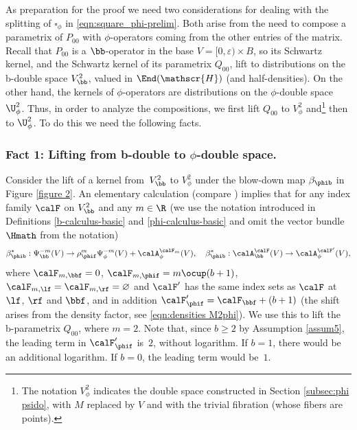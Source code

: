 As preparation for the proof we need two considerations for dealing with the splitting of $\square_\phi$ in
\eqref{eqn:square_phi-prelim}. Both arise from the need to compose a parametrix of $P_{00}$ with $\phi$\nobreakdash-operators coming from the other entries of the matrix. Recall that $P_{00}$ is a $\bb$\nobreakdash-operator in the base $V=[0,\varepsilon) \times B$, so its
Schwartz kernel, and the Schwartz kernel of its parametrix $Q_{00}$, lift to distributions on the b-double space
$V^2_\bb$, valued in $\End(\mathscr{H})$ (and half-densities). On the other hand, the kernels of $\phi$-operators are distributions on the $\phi$-double space $\U^2_\phi$. Thus, in order to analyze the compositions, we first lift $Q_{00}$ to $V^2_\phi$ and\footnote{The notation $V^2_\phi$ indicates the double space constructed in Section \ref{subsec:phi psido}, with $M$ replaced by $V$ and with the trivial fibration (whose fibers are points).} then to $\U^2_\phi$. To do this we need the following facts.

\subsubsection*{Fact 1: Lifting from b-double to $\phi$-double space.}

Consider the lift of a kernel from~$V^2_\bb$ to $V^2_\phi$ under the blow-down
map $\beta_{\phib}$ in Figure \ref{figure 2}. An elementary calculation
(compare \cite[Prop.\,1]{grieser-para}) implies that for any index
family $\calF$ on $V^2_\bb$ and any $m\in\R$ (we use the notation introduced in
Definitions \ref{b-calculus-basic} and \ref{phi-calculus-basic} and omit the vector bundle $\Hmath$ from the notation)
\begin{equation}
\label{eqn:lifting}
\beta_{\phib}^*: \Psi_\bb^{-m}(V) \to \rho_\phif^m\Psi_\phi^{-m}(V) +\calA^{\calF_m}_\phi(V),
\quad \beta_{\phib}^*: \calA^{\calF}_\bb(V) \to \calA^{\calF'}_\phi(V),
\end{equation}
where $\calF_{m,\bbf}=0$, $\calF_{m,\phif}=m \ocup (b+1)$, $\calF_{m,\lf}=\calF_{m,\rf}=\varnothing$
and $\calF'$ has the same index sets as $\calF$ at $\lf$, $\rf$ and $\bbf$, and in addition
$\calF'_\phif = \calF_\bbf+(b+1)$ (the shift arises from the density factor, see \eqref{eqn:densities M2phi}).
We use this to lift the b-parametrix $Q_{00}$, where $m=2$. Note that, since $b\geq2$ by Assumption \ref{assum5}, the leading term in $\calF'_\phif$ is~$2$, without logarithm. If $b\!=\!1$, there would be an additional logarithm. If $b\!=\!0$, the leading term would be~$1$.

